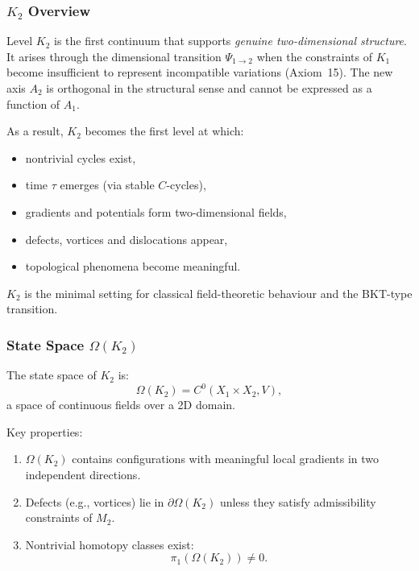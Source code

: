 

\subsubsection{\texorpdfstring{$K_2$}{K_2} Overview}
\label{sec:k2-overview}

Level $K_2$ is the first continuum that supports \emph{genuine
two-dimensional structure}. It arises through the dimensional transition
$\Psi_{1\to2}$ when the constraints of $K_1$ become insufficient to
represent incompatible variations (Axiom~15). The new axis $A_2$ is
orthogonal in the structural sense and cannot be expressed as a function
of $A_1$.

As a result, $K_2$ becomes the first level at which:
\begin{itemize}
    \item nontrivial cycles exist,
    \item time $\tau$ emerges (via stable $C$-cycles),
    \item gradients and potentials form two-dimensional fields,
    \item defects, vortices and dislocations appear,
    \item topological phenomena become meaningful.
\end{itemize}

$K_2$ is the minimal setting for classical field-theoretic behaviour and
the BKT-type transition.

\subsubsection{State Space \texorpdfstring{$\Omega(K_2)$}{\Omega(K_2)}}

The state space of $K_2$ is:
\[
\Omega(K_2) = C^0(X_1 \times X_2, V),
\]
a space of continuous fields over a 2D domain.

Key properties:
\begin{enumerate}
    \item $\Omega(K_2)$ contains configurations with meaningful local
          gradients in two independent directions.
    \item Defects (e.g., vortices) lie in $\partial\Omega(K_2)$ unless
          they satisfy admissibility constraints of $M_2$.
    \item Nontrivial homotopy classes exist:
          \[
          \pi_1(\Omega(K_2)) \neq 0.
          \]
\end{enumerate}

